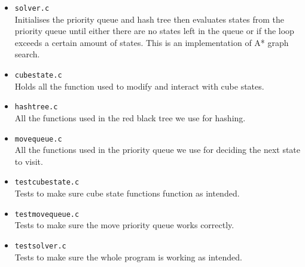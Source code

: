 \documentclass[8pt]{article}
\begin{document}
\begin{minipage}{0.45\textwidth}
    \begin{itemize}
        \item \texttt{solver.c} \\ Initialises the priority queue and hash tree then 
        evaluates states from the priority queue until either there are no states 
        left in the queue or if the loop exceeds a certain amount of states. This is an 
        implementation of A* graph search.
        \item \texttt{cubestate.c} \\ Holds all the function used to modify and interact 
        with cube states.
        \item \texttt{hashtree.c}\\  All the functions used in the red black tree we 
        use for hashing.
        \item \texttt{movequeue.c}\\ All the functions used in the priority queue we use 
        for deciding the next state to visit.
        \item \texttt{testcubestate.c}\\ Tests to make sure cube state functions 
        function as intended.
        \item \texttt{testmovequeue.c}\\ Tests to make sure the move priority queue 
        works correctly.
        \item \texttt{testsolver.c}\\ Tests to make sure the whole program is working as 
        intended.
    \end{itemize}
    \end{minipage}%
    \hfill
\end{document}
